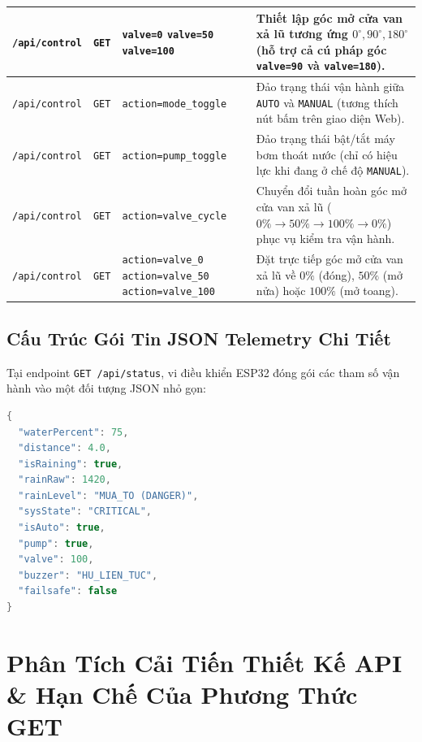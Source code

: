\begin{longtable}{|>{\raggedright\arraybackslash}p{2.5cm}|>{\centering\arraybackslash}p{1.6cm}|>{\raggedright\arraybackslash}p{3.8cm}|>{\centering\arraybackslash}p{1.7cm}|>{\raggedright\arraybackslash}p{4.9cm}|}
\texttt{/api/control} & \texttt{GET} & \texttt{valve=0} \newline \texttt{valve=50} \newline \texttt{valve=100} & 200 & Thiết lập góc mở cửa van xả lũ tương ứng $0^\circ, 90^\circ, 180^\circ$ (hỗ trợ cả cú pháp góc \texttt{valve=90} và \texttt{valve=180}). \\ \hline

\texttt{/api/control} & \texttt{GET} & \texttt{action=mode\_toggle} & 200 & Đảo trạng thái vận hành giữa \texttt{AUTO} và \texttt{MANUAL} (tương thích nút bấm trên giao diện Web). \\ \hline

\texttt{/api/control} & \texttt{GET} & \texttt{action=pump\_toggle} & 200 & Đảo trạng thái bật/tắt máy bơm thoát nước (chỉ có hiệu lực khi đang ở chế độ \texttt{MANUAL}). \\ \hline

\texttt{/api/control} & \texttt{GET} & \texttt{action=valve\_cycle} & 200 & Chuyển đổi tuần hoàn góc mở cửa van xả lũ ($0\% \to 50\% \to 100\% \to 0\%$) phục vụ kiểm tra vận hành. \\ \hline

\texttt{/api/control} & \texttt{GET} & \texttt{action=valve\_0} \newline \texttt{action=valve\_50} \newline \texttt{action=valve\_100} & 200 & Đặt trực tiếp góc mở cửa van xả lũ về $0\%$ (đóng), $50\%$ (mở nửa) hoặc $100\%$ (mở toang). \\ \hline
\end{longtable}
\endgroup

\subsection{Cấu Trúc Gói Tin JSON Telemetry Chi Tiết}
Tại endpoint \texttt{GET /api/status}, vi điều khiển ESP32 đóng gói các tham số vận hành vào một đối tượng JSON nhỏ gọn:
\begin{lstlisting}[language=C++]
{
  "waterPercent": 75,
  "distance": 4.0,
  "isRaining": true,
  "rainRaw": 1420,
  "rainLevel": "MUA_TO (DANGER)",
  "sysState": "CRITICAL",
  "isAuto": true,
  "pump": true,
  "valve": 100,
  "buzzer": "HU_LIEN_TUC",
  "failsafe": false
}
\end{lstlisting}

\section{Phân Tích Cải Tiến Thiết Kế API \& Hạn Chế Của Phương Thức GET}

